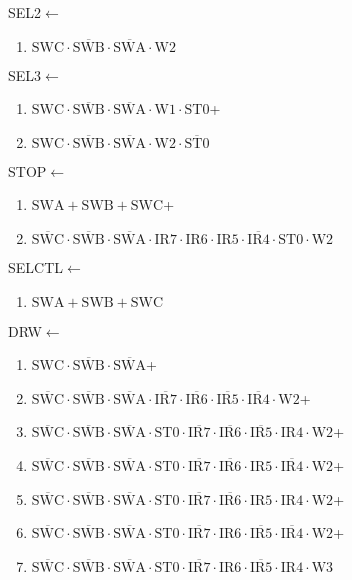 \documentclass[UTF8]{ctexart}
\begin{document}
SEL2$\leftarrow$
\begin{enumerate}[\indent\indent]
	\item$\text{SWC}\cdot\overline{\text{SWB}}\cdot\overline{\text{SWA}}\cdot\text{W2}$
\end{enumerate}
SEL3$\leftarrow$
\begin{enumerate}[\indent\indent]
	\item$\text{SWC}\cdot\overline{\text{SWB}}\cdot\overline{\text{SWA}}\cdot\text{W1}\cdot\text{ST0}$+
	\item$\text{SWC}\cdot\overline{\text{SWB}}\cdot\overline{\text{SWA}}\cdot\text{W2}\cdot\overline{\text{ST0}}$
\end{enumerate}		
STOP$\leftarrow$
\begin{enumerate}[\indent\indent]
	\item$\text{SWA}+\text{SWB}+\text{SWC}$+
	\item$\overline{\text{SWC}}\cdot\overline{\text{SWB}}\cdot\overline{\text{SWA}}\cdot {\text{IR7}} \cdot {\text{IR6}}\cdot {\text{IR5}}\cdot \overline{\text{IR4}} \cdot \text{ST0}\cdot \text{W2}$
\end{enumerate}
SELCTL$\leftarrow$
\begin{enumerate}[\indent\indent]
	\item$\text{SWA}+\text{SWB}+\text{SWC}$
\end{enumerate}
DRW$\leftarrow$
\begin{enumerate}[\indent\indent]
	\item$\text{SWC}\cdot\overline{\text{SWB}}\cdot\overline{\text{SWA}}$+
	\item $\overline{\text{SWC}} \cdot\overline{\text{SWB}}\cdot \overline{\text{SWA}} \cdot \overline{\text{IR7}} \cdot \overline{\text{IR6}} \cdot \overline{\text{IR5}} \cdot \overline{\text{IR4} }\cdot \text{W2}$+	
	\item$\overline{\text{SWC}}\cdot\overline{\text{SWB}}\cdot\overline{\text{SWA}}\cdot\text{ST0}\cdot\overline{\text{IR7}}\cdot\overline{\text{IR6}}\cdot\overline{\text{IR5}}\cdot\text{IR4}\cdot\text{W2}$+	
	\item$\overline{\text{SWC}}\cdot\overline{\text{SWB}}\cdot\overline{\text{SWA}}\cdot\text{ST0}\cdot\overline{\text{IR7}}\cdot\overline{\text{IR6}}\cdot{\text{IR5}}\cdot\overline{\text{IR4}}\cdot\text{W2}$+
	\item$\overline{\text{SWC}}\cdot\overline{\text{SWB}}\cdot\overline{\text{SWA}}\cdot\text{ST0}\cdot\overline{\text{IR7}}\cdot\overline{\text{IR6}}\cdot\text{IR5}\cdot\text{IR4}\cdot\text{W2}$+
	\item$\overline{\text{SWC}}\cdot\overline{\text{SWB}}\cdot\overline{\text{SWA}}\cdot\text{ST0}\cdot\overline{\text{IR7}}\cdot{\text{IR6}}\cdot\overline{\text{IR5}}\cdot\overline{\text{IR4}}\cdot\text{W2}$+
	\item$\overline{\text{SWC}}\cdot\overline{\text{SWB}}\cdot\overline{\text{SWA}}\cdot\text{ST0}\cdot\overline{\text{IR7}}\cdot{\text{IR6}}\cdot\overline{\text{IR5}}\cdot{\text{IR4}}\cdot\text{W3}$
\end{enumerate}
\end{document}
